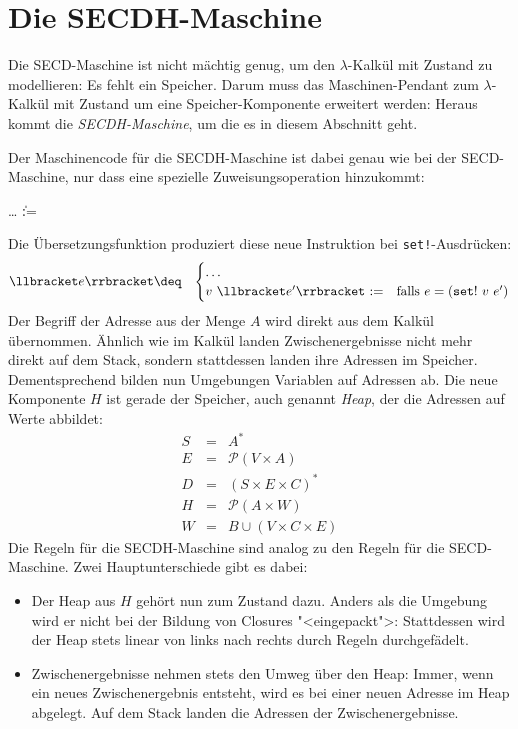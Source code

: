 \section{Die SECDH-Maschine}

Die SECD-Maschine ist nicht mächtig genug, um den $\lambda$-Kalkül mit
Zustand zu modellieren: Es fehlt ein Speicher.  Darum muss das
Maschinen-Pendant zum $\lambda$-Kalkül mit Zustand um eine
Speicher-Komponente erweitert werden: Heraus kommt die
\textit{SECDH-Maschine}, um die es in diesem Abschnitt geht.

Der Maschinencode für die SECDH-Maschine ist dabei genau wie bei der
SECD-Maschine, nur dass eine spezielle Zuweisungsoperation hinzukommt:
%
\begin{grammar}
   \: \ldots
  \> \| :=
\end{grammar}
%
Die Übersetzungsfunktion produziert diese neue Instruktion bei
\lstinline{set!}-Ausdrücken:
%
\begin{eqnarray*}
  \llbracket e \rrbracket &\deq&
  \begin{cases}
    \ldots\\
    v~\llbracket e'\rrbracket~\mathtt{:=}
    & \textrm{falls $e = (\mathtt{set!}~v~e')$}
  \end{cases}
\end{eqnarray*}  
%
Der Begriff der Adresse aus der Menge $A$ wird direkt aus dem Kalkül
übernommen.  Ähnlich wie im Kalkül landen Zwischenergebnisse nicht
mehr direkt auf dem Stack, sondern stattdessen landen ihre Adressen im
Speicher.  Dementsprechend bilden nun Umgebungen Variablen auf
Adressen ab.  Die neue Komponente $H$ ist gerade der Speicher, auch
genannt \textit{Heap}, der die Adressen auf Werte
abbildet:
%
\begin{eqnarray*}
  S &=& A^{\ast}\\
  E &=& \mathcal{P}(V\times A)\\
  D &=& (S\times E\times C)^{\ast}\\
  H &=& \mathcal{P}(A\times W)\\
  W &=& B \cup (V\times C\times E)
\end{eqnarray*}
%
Die Regeln für die SECDH-Maschine sind analog zu den Regeln für die
SECD-Maschine.  Zwei Hauptunterschiede gibt es dabei:
%
\begin{itemize}
\item Der Heap aus $H$ gehört nun zum Zustand dazu.  Anders als die
  Umgebung wird er nicht bei der Bildung von Closures "<eingepackt">:
  Stattdessen wird der Heap stets linear von links nach rechts durch
  Regeln durchgefädelt.
\item Zwischenergebnisse nehmen stets den Umweg über den Heap: Immer,
  wenn ein neues Zwischenergebnis entsteht, wird es bei einer neuen
  Adresse im Heap abgelegt. Auf dem Stack landen die
  Adressen der Zwischenergebnisse.
\end{itemize}

